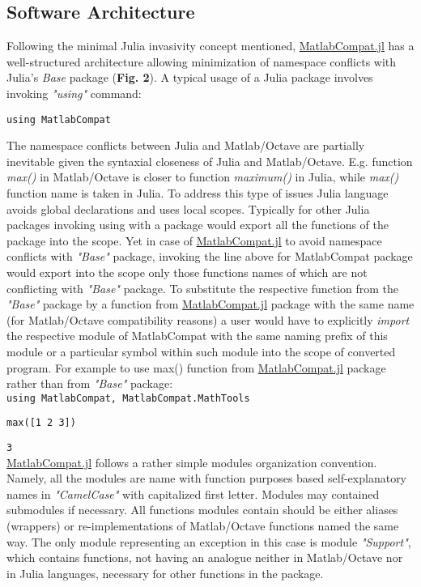 \subsection{Software Architecture}
\label{Architecture} 

Following the minimal Julia invasivity concept mentioned, \href{https://github.com/MatlabCompat/MatlabCompat.jl}{MatlabCompat.jl} has a well-structured architecture allowing minimization of namespace conflicts with Julia's \textit{Base} package (\textbf{Fig. 2}). A typical usage of a Julia package involves invoking \textit{"using"} command:

\verb|using MatlabCompat|

The namespace conflicts between Julia and Matlab/Octave are partially inevitable given the syntaxial closeness of Julia and Matlab/Octave. E.g. function \textit{max()} in Matlab/Octave is closer to function \textit{maximum()} in Julia, while \textit{max()} function name is taken in Julia. To address this type of issues Julia language avoids global declarations and uses local scopes. Typically for other Julia packages invoking using with a package would export all the functions of the package into the scope. Yet in case of \href{https://github.com/MatlabCompat/MatlabCompat.jl}{MatlabCompat.jl} to avoid namespace conflicts with \textit{"Base"} package, invoking the line above for MatlabCompat package would export into the scope only those functions names of which are not conflicting with \textit{"Base"} package. To substitute the respective function from the \textit{"Base"} package by a function from \href{https://github.com/MatlabCompat/MatlabCompat.jl}{MatlabCompat.jl} package with the same name (for Matlab/Octave compatibility reasons) a user would have to explicitly \textit{import} the respective module of MatlabCompat with the same naming prefix of this module or a particular symbol within such module into the scope of converted program. For example to use max() function from \href{https://github.com/MatlabCompat/MatlabCompat.jl}{MatlabCompat.jl} package rather than from \textit{"Base"} package:\\

\verb|using MatlabCompat, MatlabCompat.MathTools|

\verb|max([1 2 3])|

\verb|3|\\


\href{https://github.com/MatlabCompat/MatlabCompat.jl}{MatlabCompat.jl} follows a rather simple modules organization convention. Namely, all the modules are name with function purposes based self-explanatory names in \textit{"CamelCase"} with capitalized first letter. Modules may contained submodules if necessary. All functions modules contain should be either aliases (wrappers) or re-implementations of Matlab/Octave functions named the same way. The only module representing an exception in this case is module \textit{"Support"}, which contains functions, not having an analogue neither in Matlab/Octave nor in Julia languages, necessary for other functions in the package.

